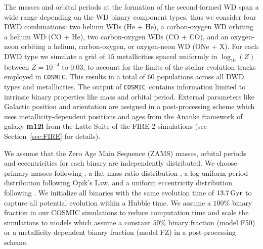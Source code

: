 \documentclass[twocolumn, linenumbers]{aastex631}
\newcommand{\cosmic}{\texttt{COSMIC}}
\begin{document}
The masses and orbital periods at the formation of the second-formed WD span a wide range depending on the WD binary component types, thus we consider four DWD combinations: two helium WDs (He + He), a carbon-oxygen WD orbiting a helium WD (CO + He), two carbon-oxygen WDs (CO + CO), and an oxygen-neon orbiting a helium, carbon-oxygen, or oxygen-neon WD (ONe + X). For each DWD type we simulate a grid of $15$ metallicities spaced uniformly in $\log_{10}(Z)$ between $Z=10^{-4}$ to $0.03$, to account for the limits of the \citet{Hurley2000} stellar evolution tracks employed in \cosmic. This results in a total of $60$ populations across all DWD types and metallicities. The output of \cosmic\ contains information limited to intrinsic binary properties like mass and orbital period. External parameters like Galactic position and orientation are assigned in a post-processing scheme which uses metallicity-dependent positions and ages from the Ananke framework of galaxy \textbf{m12i} from the Latte Suite of the FIRE-2 simulations (see Section~\ref{sec:FIRE} for details).


We assume that the Zero Age Main Sequence (ZAMS) masses, orbital periods and eccentricities for each binary are independently distributed. We choose primary masses following \citet{Kroupa2001}, a flat mass ratio distribution \citep{Mazeh1992, Goldberg1994}, a log-uniform period distribution following Opik's Law, and a uniform eccentricity distribution following \cite{Geller2019}. We initialize all binaries with the same evolution time of $13.7\,\rm{Gyr}$ to capture all potential evolution within a Hubble time. We assume a $100\%$ binary fraction in our COSMIC simulations to reduce computation time and scale the simulations to models which assume a constant $50\%$ binary fraction (model F50) or a metallicity-dependent binary fraction (model FZ) in a post-processing scheme. 
\end{document}
